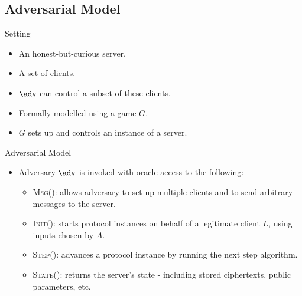 \documentclass{beamer}
\begin{document}
\subsection{Adversarial Model}
\begin{frame}{Setting}
	\begin{itemize}
		\setlength\itemsep{1em}
		\item An honest-but-curious server.
		\item A set of clients.
		\item $\adv$ can control a subset of these clients.
		\item Formally modelled using a game $G$.
		\item $G$ sets up and controls an instance of a server.
		
	\end{itemize}
\end{frame}

\begin{frame}{Adversarial Model}
	\begin{itemize}
		\setlength\itemsep{1em}
        \item Adversary $\adv$ is invoked with oracle access to the following:\\
        \begin{itemize}
            \setlength\itemsep{1em}
            \item \textsc{Msg()}: allows adversary to set up multiple clients and to send arbitrary messages to the server.
            \item \textsc{Init()}: starts protocol instances on behalf of a legitimate client $L$, using inputs chosen by $A$.
            \item \textsc{Step()}: advances a  protocol instance by running the next step algorithm.
            \item \textsc{State()}: returns the server's state - including stored ciphertexts, public parameters, etc.
        \end{itemize}
    \end{itemize}
\end{frame}
\end{document}
